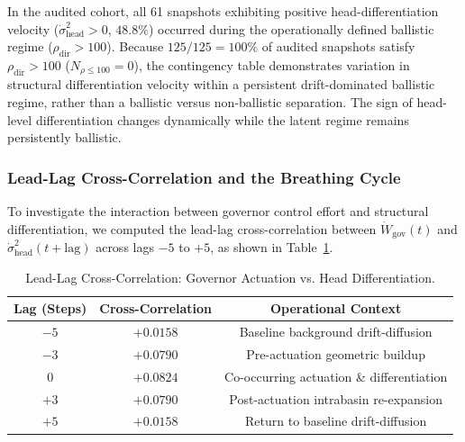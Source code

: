 \documentclass[11pt]{article}
\begin{document}
In the audited cohort, all 61 snapshots exhibiting positive head-differentiation velocity ($\dot{\sigma}^2_{\text{head}} > 0$, $48.8\%$) occurred during the operationally defined ballistic regime ($\rho_{\text{dir}} > 100$). Because $125 / 125 = 100\%$ of audited snapshots satisfy $\rho_{\text{dir}} > 100$ ($N_{\rho \le 100} = 0$), the contingency table demonstrates variation in structural differentiation velocity within a persistent drift-dominated ballistic regime, rather than a ballistic versus non-ballistic separation. The sign of head-level differentiation changes dynamically while the latent regime remains persistently ballistic.

\subsubsection{Lead-Lag Cross-Correlation and the Breathing Cycle}
To investigate the interaction between governor control effort and structural differentiation, we computed the lead-lag cross-correlation between $\dot{W}_{\text{gov}}(t)$ and $\dot{\sigma}^2_{\text{head}}(t + \text{lag})$ across lags $-5$ to $+5$, as shown in Table~\ref{tab:leadlag}.

\begin{table}[h]
\centering
\caption{Lead-Lag Cross-Correlation: Governor Actuation vs. Head Differentiation.}
\label{tab:leadlag}
\small
\begin{tabular}{ccc}
\toprule
\textbf{Lag (Steps)} & \textbf{Cross-Correlation} & \textbf{Operational Context} \\
\midrule
$-5$ & $+0.0158$ & Baseline background drift-diffusion \\
$-3$ & $+0.0790$ & Pre-actuation geometric buildup \\
$0$  & $+0.0824$ & Co-occurring actuation \& differentiation \\
$+3$ & $+0.0790$ & Post-actuation intrabasin re-expansion \\
$+5$ & $+0.0158$ & Return to baseline drift-diffusion \\
\bottomrule
\end{tabular}
\end{table}
\end{document}
